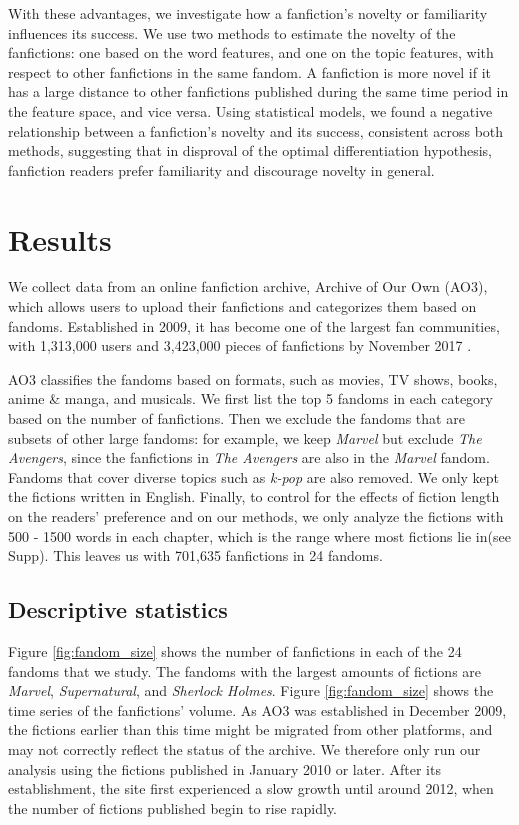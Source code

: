 \documentclass[letterpaper]{article} %
\begin{document}
With these advantages, we investigate how a fanfiction's novelty or familiarity influences its success. We use two methods to estimate the novelty of the fanfictions: one based on the word features, and one on the topic features, with respect to other fanfictions in the same fandom. A fanfiction is more novel if it has a large distance to other fanfictions published during the same time period in the feature space, and vice versa. Using statistical models, we found a negative relationship between a fanfiction's novelty and its success, consistent across both methods, suggesting that in disproval of the optimal differentiation hypothesis, fanfiction readers prefer familiarity and discourage novelty in general.


\section{Results} 
We collect data from an online fanfiction archive, Archive of Our Own (AO3), which allows users to upload their fanfictions and categorizes them based on fandoms. Established in 2009, it has become one of the largest fan communities, with 1,313,000 users and 3,423,000 pieces of fanfictions by November 2017 \cite{ao3stats}.

AO3 classifies the fandoms based on formats, such as movies, TV shows, books, anime \& manga, and musicals. We first list the top 5 fandoms in each category based on the number of fanfictions. Then we exclude the fandoms that are subsets of other large fandoms: for example, we keep \emph{Marvel} but exclude \emph{The Avengers}, since the fanfictions in \emph{The Avengers} are also in the \emph{Marvel} fandom. Fandoms that cover diverse topics such as \emph{k-pop} are also removed. We only kept the fictions written in English. Finally, to control for the effects of fiction length on the readers' preference and on our methods, we only analyze the fictions with 500 - 1500 words in each chapter, which is the range where most fictions lie in(see Supp). This leaves us with 701,635 fanfictions in 24 fandoms. 


\subsection*{Descriptive statistics}

Figure \ref{fig:fandom_size} shows the number of fanfictions in each of the 24 fandoms that we study. The fandoms with the largest amounts of fictions are \emph{Marvel}, \emph{Supernatural}, and \emph{Sherlock Holmes}. Figure \ref{fig:fandom_size}  shows the time series of the fanfictions' volume. As AO3 was established in December 2009, the fictions earlier than this time might be migrated from other platforms, and may not correctly reflect the status of the archive. We therefore only run our analysis using the fictions published in January 2010 or later. After its establishment, the site first experienced a slow growth until around 2012, when the number of fictions published begin to rise rapidly. 
\end{document}
